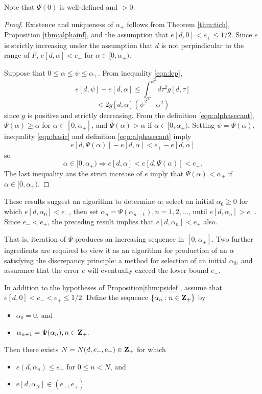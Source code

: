  Note that $\Psi(0)$ is well-defined and $>0$.

\begin{proof} Existence and uniqueness of $\alpha_+$ follows from Theorem \ref{thm:tich}, Proposition \ref{thm:alphainf}, and the assumption that $e[d,0]<e_+\le 1/2$. Since $e$ is strictly increasing under the assumption that $d$ is not perpindicular to the range of $F$, $e[d,\alpha]<e_+$ for $\alpha \in [0,\alpha_+)$. 

Suppose that $0 \le \alpha \le \psi \le \alpha_+$. From inequality \ref{eqn:lep}, 
\[
e[d,\psi]-e[d,\alpha] \le \int^{\psi^2}_{\alpha^2} d\tau^2 g[d,\tau] 
\]
\begin{equation}
\label{eqn:basic}
< 2 g[d,\alpha] (\psi^2-\alpha^2)  
\end{equation}
since $g$ is positive and strictly decreasing. From the definition \ref{eqn:alphasecant}, $\Psi(\alpha) \ge \alpha$ for $\alpha \in [0,\alpha_+]$, and $\Psi(\alpha)>\alpha$ if $\alpha \in [0,\alpha_+)$. Setting $\psi=\Psi(\alpha)$, 
inequality \ref{eqn:basic} and definition \ref{eqn:alphasecant} imply
\[
e[d,\Psi(\alpha)]-e[d,\alpha] < e_{+}-e[d,\alpha]
\]
so
\begin{equation}
\label{eqn:assert}
\alpha \in [0,\alpha_+) \Rightarrow e[d,\alpha] < e[d,\Psi(\alpha)] < e_{+}.
\end{equation}
The last inequality ans the strict increase of $e$ imply that $\Psi(\alpha)<\alpha_+$ if $\alpha \in [0,\alpha_+)$.
\end{proof}

These results suggest an algorithm to determine $\alpha$: select an initial $\alpha_0 \ge 0$ for which $e[d,\alpha_0]<e_-$, then set $\alpha_n=\Psi(\alpha_{n-1}), n=1,2,...$, until $e[d,\alpha_n] > e_-$. Since $e_-<e_+$, the preceding result implies that $e[d,\alpha_n]<e_+$ also. 

That is, iteration of $\Psi$ produces an increasing sequence in $[0,\alpha_+]$. Two further ingredients are required to view it as an algorithm for production of an $\alpha$ satisfying the discrepancy principle:  a method for selection of an initial $\alpha_0$, and assurance that the error $e$ will eventually exceed the lower bound $e_-$. 

\begin{theorem}
  \label{thm:discrepalg} In addition to the hypotheses of Proposition\ref{thm:psidef}, assume that $e[d,0] <e_-<e_+\le 1/2$. Define the sequence $\{\alpha_n: n \in {\bf Z}_+\}$ by
  \begin{itemize}
      \item $\alpha_0=0$, and
      \item $\alpha_{n+1}=\Psi(\alpha_n), n \in {\bf Z}_+$.
  \end{itemize}
  Then there exists $N=N(d,e_-,e_+) \in {\bf Z}_+$ for which 
  \begin{itemize}
      \item $e(d,\alpha_n) \le e_-$ for $0 \le n <N$, and
      \item $e[d,\alpha_N] \in (e_-,e_+)$
  \end{itemize}
\end{theorem}

